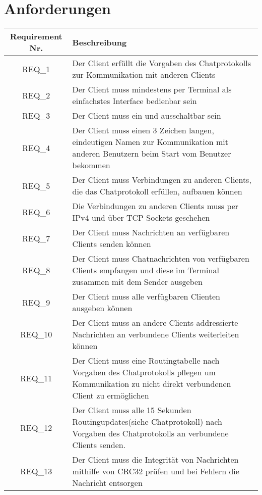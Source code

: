 \section{Anforderungen}

\begin{tabular}{|c|p{13.5cm}|}
\hline
Requirement Nr. & Beschreibung
\\ \hline

REQ\_1 & Der Client erfüllt die Vorgaben des Chatprotokolls zur Kommunikation mit anderen Clients\\
\hline
REQ\_2 & Der Client muss mindestens per Terminal als einfachstes Interface bedienbar sein \\
\hline
REQ\_3 & Der Client muss ein\- und ausschaltbar sein\\
\hline
REQ\_4 & Der Client muss einen 3 Zeichen langen, eindeutigen Namen zur Kommunikation mit anderen Benutzern beim Start vom Benutzer bekommen\\
\hline
REQ\_5 & Der Client muss Verbindungen zu anderen Clients, die das Chatprotokoll erfüllen, aufbauen können\\
\hline
REQ\_6 & Die Verbindungen zu anderen Clients muss per IPv4 und über TCP Sockets geschehen\\
\hline
REQ\_7 & Der Client muss Nachrichten an verfügbaren Clients senden können\\
\hline
REQ\_8 & Der Client muss Chatnachrichten von verfügbaren Clients empfangen und diese im Terminal zusammen mit dem Sender ausgeben\\
\hline
REQ\_9 & Der Client muss alle verfügbaren Clienten ausgeben können\\
\hline
REQ\_10 & Der Client muss an andere Clients addressierte Nachrichten an verbundene Clients weiterleiten können\\
\hline
REQ\_11 & Der Client muss eine Routingtabelle nach Vorgaben des Chatprotokolls pflegen um Kommunikation zu nicht direkt verbundenen Client zu ermöglichen\\
\hline
REQ\_12 & Der Client muss alle 15 Sekunden Routingupdates(siehe Chatprotokoll) nach Vorgaben des Chatprotokolls an verbundene Clients senden.\\
\hline
REQ\_13 & Der Client muss die Integrität von Nachrichten mithilfe von CRC32 prüfen und bei Fehlern die Nachricht entsorgen\\
\hline
\end{tabular}